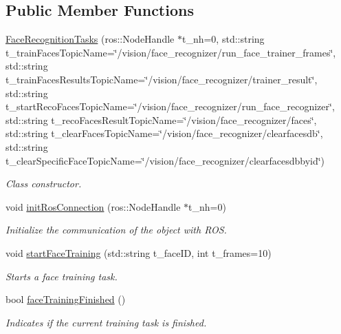 \subsection*{Public Member Functions}
\begin{DoxyCompactItemize}
\item 
\hyperlink{class_face_recognition_tasks_af1a16e79e520294fdb8d42f9c8fd5a37}{Face\+Recognition\+Tasks} (ros\+::\+Node\+Handle $\ast$t\+\_\+nh=0, std\+::string t\+\_\+train\+Faces\+Topic\+Name=\char`\"{}/vision/face\+\_\+recognizer/run\+\_\+face\+\_\+trainer\+\_\+frames\char`\"{}, std\+::string t\+\_\+train\+Faces\+Results\+Topic\+Name=\char`\"{}/vision/face\+\_\+recognizer/trainer\+\_\+result\char`\"{}, std\+::string t\+\_\+start\+Reco\+Faces\+Topic\+Name=\char`\"{}/vision/face\+\_\+recognizer/run\+\_\+face\+\_\+recognizer\char`\"{}, std\+::string t\+\_\+reco\+Faces\+Result\+Topic\+Name=\char`\"{}/vision/face\+\_\+recognizer/faces\char`\"{}, std\+::string t\+\_\+clear\+Faces\+Topic\+Name=\char`\"{}/vision/face\+\_\+recognizer/clearfacesdb\char`\"{}, std\+::string t\+\_\+clear\+Specific\+Face\+Topic\+Name=\char`\"{}/vision/face\+\_\+recognizer/clearfacesdbbyid\char`\"{})
\begin{DoxyCompactList}\small\item\em Class constructor. \end{DoxyCompactList}\item 
void \hyperlink{class_face_recognition_tasks_ab8c3737919b138bd11bff876d666a1df}{init\+Ros\+Connection} (ros\+::\+Node\+Handle $\ast$t\+\_\+nh=0)
\begin{DoxyCompactList}\small\item\em Initialize the communication of the object with R\+OS. \end{DoxyCompactList}\item 
void \hyperlink{class_face_recognition_tasks_a72c4e648abec1894008a5395c23afa29}{start\+Face\+Training} (std\+::string t\+\_\+face\+ID, int t\+\_\+frames=10)
\begin{DoxyCompactList}\small\item\em Starts a face training task. \end{DoxyCompactList}\item 
bool \hyperlink{class_face_recognition_tasks_aea15e4e1881ec649181c4024ada2e7b9}{face\+Training\+Finished} ()
\begin{DoxyCompactList}\small\item\em Indicates if the current training task is finished. \end{DoxyCompactList}\item 

\end{DoxyCompactItemize}
